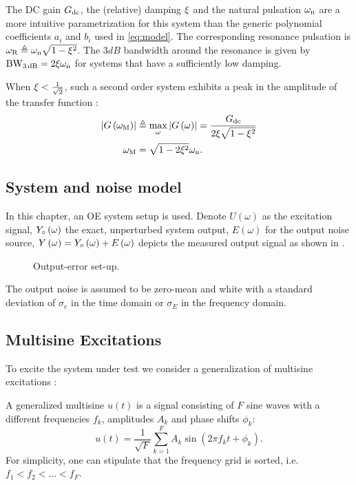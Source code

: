   The DC gain $G_{\mathrm{dc}}$, the (relative) damping $\xi$ and the natural pulsation $\omega_{\mathrm{n}}$ are a more intuitive parametrization for this system than the generic polynomial coefficients $a_i$ and $b_i$ used in \eqref{eq:model}.
  The corresponding resonance pulsation is $\omega_{\mathrm{R}} \triangleq \omega_{\mathrm{n}} \sqrt{1-\xi^2}$.
  The $3\unit{dB}$ bandwidth around the resonance is given by $\mathrm{BW}_{3\,\mathrm{dB}} = 2\xi\omega_{\mathrm{n}}$ for systems that have a sufficiently low damping.
  
  When $\xi < \frac{1}{\sqrt{2}}$, such a second order system exhibits a peak in
  the amplitude of the transfer function \citep{Oppenheim1983}:
  \begin{align}
   \left| G\left(\omega_{\mathrm{M}} \right) \right| & \triangleq
          \max_{\omega} \left| G\left( \omega \right)  \right|
        = \frac{G_{\mathrm{dc}}}
               {2 \xi \sqrt{1-\xi^2}}
               \label{eq:peakAmplitude}\\
   \omega_{\mathrm{M}} &
        = \sqrt{1-2\xi^2} \omega_{\mathrm{n}}
        \label{eq:peakFrequency}
    \text{.}
  \end{align}

\subsection{System and noise model}
  In this chapter, an \gls{OE} system setup is used.
  Denote
    $U  \left(\omega\right)$ as the excitation signal,
    ${Y}_{\circ}\left(\omega\right)$ the exact, unperturbed system output,
    $E  \left(\omega\right)$ for the output noise source,
    $Y  \left(\omega\right) = {Y}_{\circ}\left( \omega \right) + E\left( \omega \right)$ depicts the measured output signal as shown in .

  \begin{figure}
    \centering
    
    \caption[Output-error]{Output-error set-up.}
    \label{fig:excitation:OE}
  \end{figure}

  The output noise is assumed to be zero-mean and white with a
  standard deviation of $\sigma_e$ in the time domain or $\sigma_E$ in the frequency domain.

\subsection{Multisine Excitations}
  To excite the system under test we consider a generalization of multisine excitations \citep{Pintelon2012}:
  \begin{definition} \label{def:generalized-MS}
  A generalized multisine $u(t)$ is a signal consisting of $F$ sine waves with a different frequencies $f_k$, amplitudes $A_k$ and phase shifts $\phi_k$:
  \begin{equation}
    u \left( t\right) = \frac{1}{\sqrt{F}}
   \sum_{k=1}^{F} 
     A_k 
     \sin 
       \left(2\pi f_k t + \phi_k \right)
  \text{.}
  \label{eq:MultisineCT}
  \end{equation}
  For simplicity, one can stipulate that the frequency grid is sorted, i.e. $f_1 < f_2 < \ldots < f_F$.
  \end{definition}

